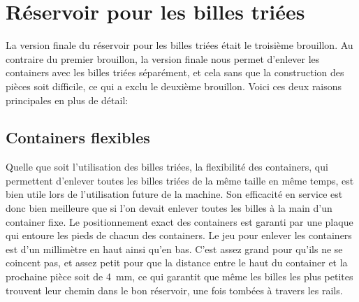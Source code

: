 




\section{Réservoir pour les billes triées}
La version finale du réservoir pour les billes triées était le troisième brouillon. Au contraire du premier brouillon, la version finale nous permet d'enlever les containers avec les billes triées séparément, et cela sans que la construction des pièces soit difficile, ce qui a exclu le deuxième brouillon. Voici ces deux raisons principales en plus de détail:

\subsection{Containers flexibles}
Quelle que soit l'utilisation des billes triées, la flexibilité des containers, qui permettent d'enlever toutes les billes triées de la même taille en même temps, est bien utile lors de l'utilisation future de la machine. Son efficacité en service est donc bien meilleure que si l'on devait enlever toutes les billes à la main d'un container fixe. Le positionnement exact des containers est garanti par une plaque %
qui entoure les pieds de chacun des containers. Le jeu pour enlever les containers est d'un millimètre en haut ainsi qu'en bas. C'est assez grand pour qu'ils ne se coincent pas, et assez petit pour que la distance entre le haut du container et la prochaine pièce soit de \SI{4}{\mm}, ce qui garantit que même les billes les plus petites trouvent leur chemin dans le bon réservoir, une fois tombées à travers les rails.

